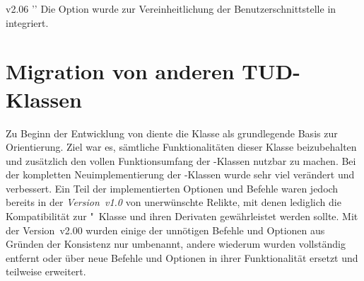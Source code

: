 \begin{Obsolete}{v2.06}{}%
  ''
\printdeclarationlist%
%
Die Option  wurde zur Vereinheitlichung der 
Benutzerschnittstelle in  integriert.
\end{Obsolete}



\section[%
  Das Paket \PackageRaw{tudscrcomp}{\BooleanFalse}
  -- Migration von anderen TUD-Klassen%
]{%
  Migration von anderen TUD-Klassen%
}
\begin{Entity'}{}
%
%

\noindent{}

\bigskip\noindent
Zu Beginn der Entwicklung von \TUDScript diente die Klasse  als 
grundlegende Basis zur Orientierung. Ziel war es, sämtliche Funktionalitäten 
dieser Klasse beizubehalten und zusätzlich den vollen Funktionsumfang der 
\KOMAScript-Klassen nutzbar zu machen. Bei der kompletten Neuimplementierung 
der \TUDScript-Klassen wurde sehr viel verändert und verbessert. Ein Teil der 
implementierten Optionen und Befehle waren jedoch bereits in der 
\emph{Version~v1.0} von \TUDScript unerwünschte Relikte, mit denen lediglich 
die Kompatibilität zur "~Klasse und ihren Derivaten 
gewährleistet werden sollte. Mit der Version~v2.00 wurden einige der unnötigen 
Befehle und Optionen aus Gründen der Konsistenz nur umbenannt, andere wiederum 
wurden vollständig entfernt oder über neue Befehle und Optionen in ihrer 
Funktionalität ersetzt und teilweise erweitert. 


\end{Entity'}
